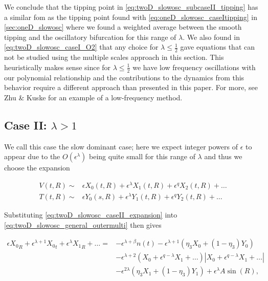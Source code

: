 We conclude that the tipping point in \eqref{eq:twoD_slowosc_subcaseII_tipping} has a similar fom as the tipping point found with \eqref{eq:oneD_slowosc_caseItipping} in \autoref{sec:oneD_slowosc} where we found a weighted average between the smooth tipping and the oscillatory bifurcation for this range of $\lambda$. We also found in \eqref{eq:twoD_slowosc_caseI_O2} that any choice for $\lambda\le\frac{1}{2}$ gave equations that can not be studied using the multiple scales approach in this section. This heuristically makes sense since for $\lambda\le \frac{1}{2}$ we have low frequency oscillations with our polynomial relationship and the contributions to the dynamics from this behavior require a different approach than presented in this paper. For more, see Zhu \& Kuske \cite{zhu2015tipping} for an example of a low-frequency method.

\subsection{Case II: $\lambda>1$}

We call this case the slow dominant case; here we expect integer powers of $\epsilon$ to appear due to the $O(\epsilon^\lambda)$ being quite small for this range of $\lambda$ and thus we choose the expansion 

\begin{equation}\label{eq:twoD_slowosc_caseII_expansion}
\begin{aligned}
V(t,R) \sim& \epsilon X_0(t,R)+\epsilon^\lambda X_1(t,R)+\epsilon^q X_2(t,R)+\ldots\\
T(t,R) \sim& \epsilon Y_0(s,R) + \epsilon^\lambda Y_1(t,R) +\epsilon^q Y_2(t,R)+\ldots
\end{aligned}
\end{equation}

Substituting \eqref{eq:twoD_slowosc_caseII_expansion} into \eqref{eq:twoD_slowosc_general_outermulti} then gives

\begin{equation*}
\begin{aligned}
\epsilon {X_0}_R+\epsilon^{\lambda+1}{X_0}_t+\epsilon^\lambda {X_1}_R+\ldots={} & -\epsilon^{\lambda+\beta}n(t)-\epsilon^{\lambda+1} (\eta_3X_0+(1-\eta_3)Y_0) \\
&-\epsilon^{\lambda+2}(X_0+\epsilon^{q-\lambda} X_1+\ldots)|X_0+\epsilon^{q-\lambda} X_1+\ldots|\\
& - \epsilon^{2\lambda}(\eta_3X_1+(1-\eta_3)Y_1) + \epsilon^\lambda A\sin(R),
\end{aligned}
\end{equation*}

